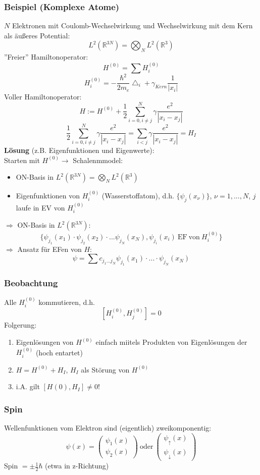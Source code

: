 \documentclass[twoside,a4paper]{scrartcl}
\renewcommand{\1}{\mathds{1}}
\newcommand{\ra}{\rightarrow}
\begin{document}
\subsubsection*{Beispiel (Komplexe Atome)}
$N$ Elektronen mit Coulomb-Wechselwirkung und Wechselwirkung mit dem Kern als äußeres Potential:
$$L^2(\mathbb R^{3N})=\bigotimes_N L^2(\mathbb R^{3})$$
''Freier'' Hamiltonoperator:
$$H^{(0)}=\sum H_i^{(0)}$$
$$H_i^{(0)}=-\frac{\hbar^2}{2m_e}\bigtriangleup_i +\gamma_{Kern} \frac{1}{|x_i|}$$
Voller Hamiltonoperator:
$$H:=H^{(0)}+\frac{1}{2}\sum_{i=0,i \neq j}^N\gamma \frac{e^2}{|x_i-x_j|}$$
$$\frac{1}{2}\sum_{i=0,i \neq j}^N\gamma \frac{e^2}{|x_i-x_j|}=\sum_{i<j}\gamma \frac{e^2}{|x_i-x_j|}=H_I$$
\textbf{Lösung} (z.B. Eigenfunktionen und Eigenwerte):\\
Starten mit $H^{(0)} \ra$ Schalenmmodel:
\begin{itemize}
 \item ON-Basis in $L^2(\mathbb R^{3N})=\bigotimes_N L^2(\mathbb R^3)$
 \item Eigenfunktionen von $H_i^{(0)}$ (Wasserstoffatom), d.h. $\{ \psi_j(x_\nu) \}$, $\nu=1, ... ,N$, $j$ laufe in EV von $H_i^{(0)}$
\end{itemize}
 $\Rightarrow$ ON-Basis in $L^2(\mathbb R^{3N})$:
$$\{\psi_{j_1}(x_1) \cdot \psi_{j_2}(x_2) \cdot ... \psi_{j_N}(x_N), \psi_{j_i}(x_i) \mathrm{\ EF\ von \ } H_i^{(0)} \}$$
 $\Rightarrow$ Ansatz für EFen von $H$:
$$\psi=\sum c_{j_1...j_N}\psi_{j_1}(x_1)\cdot ... \cdot \psi_{j_N}(x_N)$$

\subsubsection*{Beobachtung}
Alle $H_i^{(0)}$ kommutieren, d.h. 
$$[H_i^{(0)},H_j^{(0)}]=0$$
Folgerung: 
\begin{enumerate}
\item Eigenlösungen von $H^{(0)}$ einfach miitels Produkten von Eigenlösungen der $H_i^{(0)}$ (hoch entartet)
\item $H=H^{(0)}+H_I$, $H_I$ als Störung von $H^{(0)}$
\item i.A. gilt $[H{(0)},H_I]\neq 0$!
\end{enumerate}

\subsubsection*{Spin}
Wellenfunktionen vom Elektron sind (eigentlich) zweikomponentig:
$$\psi(x)=\begin{pmatrix} \psi_1(x) \\ \psi_2(x)\end{pmatrix} \ \mathrm{oder} \ \begin{pmatrix} \psi_\uparrow(x) \\ \psi_\downarrow(x)\end{pmatrix}
$$
Spin $=\pm \frac{1}{2} \hbar$ (etwa in z-Richtung)
\end{document}
